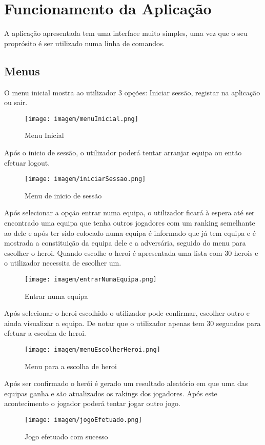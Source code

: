 \chapter{Funcionamento da Aplicação }

A aplicação apresentada tem uma interface muito simples, uma vez que o seu
proprósito é ser utilizado numa linha de comandos.

\section{Menus }
O menu inicial mostra ao utilizador 3 opções: Iniciar sessão, registar na aplicação ou sair. 

\begin{figure}[tbph]
	\centering
	\texttt{[image: imagem/menuInicial.png]}
	\caption{Menu Inicial}
	\label{fig:menuInicial}
\end{figure}

Após o inicio de sessão, o utilizador poderá tentar arranjar equipa ou então efetuar logout. 
\begin{figure}[tbph]
	\centering
	\texttt{[image: imagem/iniciarSessao.png]}
	\caption{Menu de inicio de sessão}
	\label{fig:iniciar sessao}
\end{figure}

Após selecionar a opção entrar numa equipa, o utilizador ficará à espera até ser encontrado uma equipa que tenha outros jogadores com um ranking semelhante ao dele e após ter sido colocado numa equipa é informado que já tem equipa e é mostrada a constituição da equipa dele e a adversária, seguido do menu para escolher o heroi. Quando escolhe o heroi é apresentada uma lista com 30 herois e o utilizador necessita de escolher um. 

\begin{figure}[tbph]
	\centering
	\texttt{[image: imagem/entrarNumaEquipa.png]}
	\caption{Entrar numa equipa}
	\label{fig:Entrarnumaequipa}
\end{figure}

\newpage

Após selecionar o heroi escolhido o utilizador pode confirmar, escolher outro e ainda visualizar a equipa. De notar que o utilizador apenas tem 30 segundos para efetuar a escolha de heroi. 

\begin{figure}[tbph]
	\centering
	\texttt{[image: imagem/menuEscolherHeroi.png]}
	\caption{Menu para a escolha de heroi}
	\label{fig:escolher heroi}
\end{figure}

Após ser confirmado o herói é gerado um resultado aleatório em que uma das equipas ganha e são atualizados os rakings dos jogadores. Após este acontecimento o jogador poderá tentar jogar outro jogo. 
\begin{figure}[tbph]
	\centering
	\texttt{[image: imagem/jogoEfetuado.png]}
	\caption{Jogo efetuado com sucesso}
	\label{fig:jogoEfetuado}
\end{figure}




